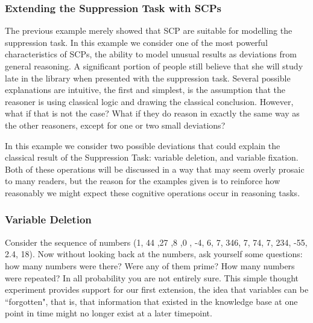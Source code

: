 \documentclass{article}
\begin{document}
\subsubsection{Extending the Suppression Task with SCPs}
The previous example merely showed that SCP are suitable for modelling the suppression task. In this example we consider one of the most powerful characteristics of SCPs, the ability to model unusual results as deviations from general reasoning. A significant portion of people still believe that she will study late in the library when presented with the suppression task. Several possible explanations are intuitive, the first and simplest, is the assumption that the reasoner is using classical logic and drawing the classical conclusion. However, what if that is not the case? What if they do reason in exactly the same way as the other reasoners, except for one or two small deviations?

In this example we consider two possible deviations that could explain the classical result of the Suppression Task: variable deletion, and variable fixation. Both of these operations will be discussed in a way that may seem overly prosaic to many readers, but the reason for the examples given is to reinforce how reasonably we might expect these cognitive operations occur in reasoning tasks.

\subsubsection*{Variable Deletion} \label{ssec:variableDeletion}

Consider the sequence of numbers (1, 44 ,27 ,8 ,0 , -4, 6, 7, 346, 7, 74, 7, 234, -55, 2.4, 18). Now without looking back at the numbers, ask yourself some questions: how many numbers were there? Were any of them prime? How many numbers were repeated? In all probability you are not entirely sure. This simple thought experiment provides support for our first extension, the idea that variables can be ``forgotten", that is, that information that existed in the knowledge base at one point in time might no longer exist at a later timepoint. 
\end{document}
